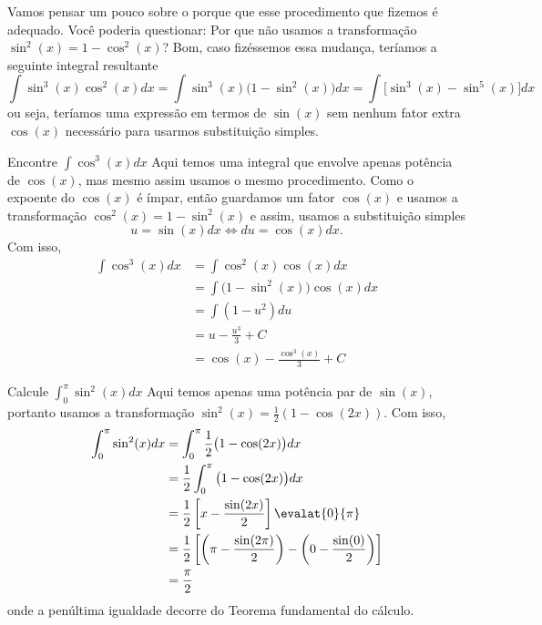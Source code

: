 Vamos pensar um pouco sobre o porque que esse procedimento que fizemos é adequado.
Você poderia questionar: Por que não usamos a transformação
$\sin^2(x)=1-\cos^2(x)$?
Bom, caso fizéssemos essa mudança, teríamos a seguinte integral resultante
\[
  \int \sin^3(x)\cos^2(x) dx
  = \int \sin^3(x)\big(1-\sin^2(x) \big) dx
  = \int \big[ \sin^3(x)- \sin^5(x) \big] dx
\]
ou seja, teríamos uma expressão em termos de $\sin(x)$ sem nenhum fator
extra $\cos(x)$ necessário para usarmos substituição simples.

\begin{example}
  Encontre \(\int \cos^3(x)dx\)
  \solution
  Aqui temos uma integral que envolve apenas potência de
  $\cos(x)$, mas mesmo assim usamos o mesmo procedimento.
  Como o expoente do $\cos(x)$ é ímpar, então guardamos um fator
  $\cos(x)$ e usamos a transformação $\cos^2(x)= 1-\sin^2(x)$ e assim,
  usamos a substituição simples
  \[
    u = \sin(x) dx \Leftrightarrow du=\cos(x)dx.
  \]
  Com isso,
  \begin{align*}
    \int \cos^3(x)dx & = \int \cos^2(x) \cos(x)dx            \\
                     & = \int \big(1-\sin^2(x)\big)\cos(x)dx \\
                     & = \int \left(1-u^2\right)du           \\
                     & = u- \frac{u^3}{3}+C                  \\
                     & = \cos(x)- \frac{\cos^3(x)}{3}+C
  \end{align*}
\end{example}

\begin{example}
  Calcule \(\int_0^{\pi} \sin^2(x) dx\)
  \solution
  Aqui temos apenas uma potência par de $\sin(x)$,
  portanto usamos a transformação
  $\sin^2(x)= \frac{1}{2}(1-\cos(2x))$.
  Com isso,
  \begin{align*}
    \int_0^{\pi} \sin^2(x) dx
    & = \int_0^\pi \frac{1}{2}\big(1-\cos(2x)\big) dx \\
    & = \frac{1}{2} \int_0^\pi \big(1-\cos(2x)\big) dx \\
    & = \frac{1}{2} \left[ x - \frac{\sin(2x)}{2}\right] \evalat{0}{\pi} \\
    & = \frac{1}{2}
        \left[
          \left( \pi - \frac{\sin(2\pi)}{2} \right)
         -\left(   0 - \frac{\sin(0)}{2}    \right)
        \right] \\
    & = \frac{\pi}{2}
  \end{align*}
  onde a penúltima igualdade decorre do Teorema fundamental do cálculo.
\end{example}

